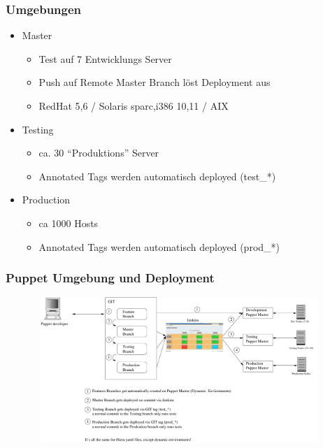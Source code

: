 \documentclass{beamer}
\begin{document}

\begin{frame}
\end{frame}

\begin{frame}
  \frametitle{Umgebungen}

    \begin{itemize}
    \item Master
      \begin{itemize}
      \item Test auf 7 Entwicklungs Server
      \item Push auf Remote Master Branch löst Deployment aus
      \item RedHat 5,6 / Solaris {sparc,i386} {10,11} / AIX
      \end{itemize}
    \item Testing
      \begin{itemize}
      \item ca. 30 ``Produktions'' Server
      \item Annotated Tags werden automatisch deployed (test\_*)
      \end{itemize}
    \item Production
      \begin{itemize}
      \item ca 1000 Hosts
      \item Annotated Tags werden automatisch deployed (prod\_*)
      \end{itemize}
    \end{itemize}
\end{frame}

\begin{frame}
  \frametitle{Puppet Umgebung und Deployment}
  \begin{figure}[ht]
    \centering
      \includegraphics[height=5.5cm,width=11cm]{../pics/puppet_deployment2}
  \end{figure}
\end{frame}
\end{document}
